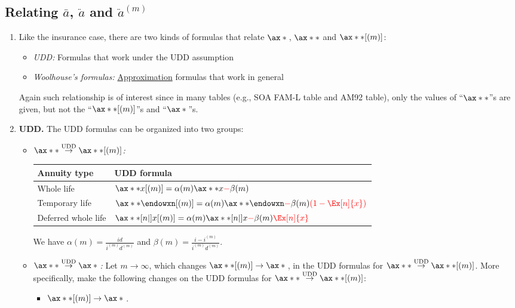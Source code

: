\subsection{Relating \(\bar{a}\), \(\ddot{a}\) and \(\ddot{a}^{(m)}\)}
\begin{enumerate}
\item Like the insurance case, there are two kinds of formulas that relate
\(\ax*{}\), \(\ax**{}\) and \(\ax**{}[(m)]\):
\begin{itemize}
\item \emph{UDD:} Formulas that work under the UDD assumption
\item \emph{Woolhouse's formulas:} \underline{Approximation} formulas that work in general
\end{itemize}
Again such relationship is of interest since in many tables (e.g., SOA FAM-L
table and AM92 table), only the values of ``\(\ax**{}\)''s are given, but not
the ``\(\ax**{}[(m)]\)''s and ``\(\ax*{}\)''s.
\item \label{it:udd-relate-annuity} \textbf{UDD.} The UDD formulas can be
organized into two groups:
\begin{itemize}
\item \emph{\(\ax**{}\overset{\text{UDD}}{\to}\ax**{}[(m)]\):}
\begin{center}
\begin{tabular}{ll}
\toprule
Annuity type&UDD formula \\
\midrule
Whole life&\(\ax**{x}[(m)]=\alpha(m)\ax**{x}\rc{-}\beta(m)\) \\
Temporary life&\(\ax**{\endowxn}[(m)]=\alpha(m)\ax**{\endowxn}\rc{-}\beta(m)\rc{(1-\Ex[n]{x})}\) \\
Deferred whole life&\(\ax**[n|]{x}[(m)]=\alpha(m)\ax**[n|]{x}\rc{-}\beta(m)\rc{\Ex[n]{x}}\) \\
\bottomrule
\end{tabular}
\end{center}
We have \(\displaystyle \alpha(m)=\frac{id}{i^{(m)}d^{(m)}}\) and
\(\displaystyle \beta(m)=\frac{i-i^{(m)}}{i^{(m)}d^{(m)}}\).
\item \emph{\(\ax**{}\overset{\text{UDD}}{\to}\ax*{}\):} Let \(m\to\infty\),
which changes \(\ax**{}[(m)]\to\ax*{}\), in the UDD formulas for
\(\ax**{}\overset{\text{UDD}}{\to}\ax**{}[(m)]\). More specifically, make the
following changes on the UDD formulas for
\(\ax**{}\overset{\text{UDD}}{\to}\ax**{}[(m)]\):
\begin{itemize}
\item \(\ax**{}[(m)]\to \ax*{}\).

\end{itemize}
\end{itemize}
\end{enumerate}
